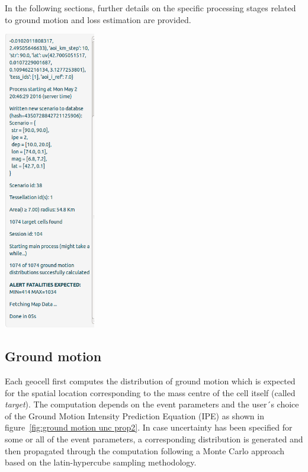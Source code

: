 \documentclass[12p]{article}
\begin{document}
In the following sections, further details on the specific processing stages
related to ground motion and loss estimation are provided.


\begin{center}
	\includegraphics[width=4cm]{proc_log}
\end{center}

\subsection{Ground motion}
\label{sec:impact comp/ground motion}

Each geocell first computes the distribution of ground motion which is expected
for the spatial location corresponding to the mass centre of the cell itself
(called \emph{target}).
The computation depends on the event parameters and the user´s choice of the
Ground Motion Intensity Prediction Equation (IPE) as shown in
figure~\ref{fig:ground motion unc prop2}.
In case uncertainty has been specified for some or all of the event parameters,
a corresponding distribution is generated and then propagated through the
computation following a Monte Carlo approach based on the latin-hypercube
sampling methodology. 
\end{document}

